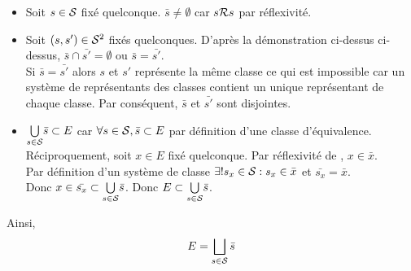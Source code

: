\documentclass{article}
\begin{document}
\begin{question_kholle}
  \begin{itemize}[label=\textemdash]
    \item Soit $s\in \mathcal S$ fixé quelconque. $\bar{s} \neq \emptyset$ car $s \mathcal R s$ par réflexivité.
    \item Soit $(s, s') \in \mathcal S^2$ fixés quelconques. D'après la démonstration ci-dessus ci-dessus, $\bar{s} \cap \bar{s'} = \emptyset$ ou $\bar{s} = \bar{s'}$.\\
          Si $\bar{s} = \bar{s'}$ alors $s$ et $s'$ représente la même classe ce qui est impossible car un système de représentants des classes contient un unique représentant de chaque classe. Par conséquent, $\bar{s}$ et $\bar{s'}$ sont disjointes.
    \item $\underset{s \in \mathcal S}{\bigcup} \bar{s} \subset E$ car $\forall s \in \mathcal S, \bar{s} \subset E$ par définition d'une classe d'équivalence. \\
          Réciproquement, soit $x \in E$ fixé quelconque.
          Par réflexivité de \Rel, $x \in \bar{x}$. \\
          Par définition d'un système de classe $\exists ! s_x \in \mathcal S : s_x \in \bar{x}$ et $\bar{s_x} = \bar{x}$.\\
          Donc $x \in \bar{s_x} \subset \underset{s \in \mathcal S}{\bigcup} \bar{s}$. Donc $E \subset \underset{s \in \mathcal S}{\bigcup} \bar{s}$.
  \end{itemize}

  Ainsi,
  $$E = \bigsqcup_{s \in \mathcal S} \bar{s}$$

\end{question_kholle}
\end{document}
